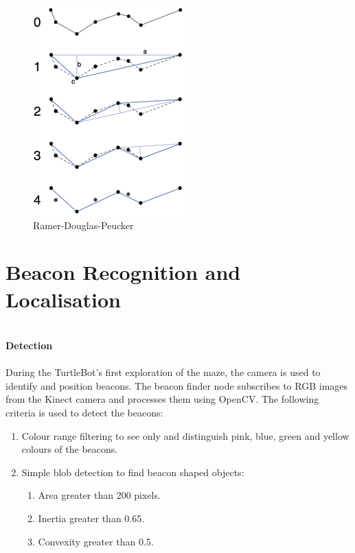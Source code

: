 \documentclass[titlepage,12pt,a4paper]{article}
\begin{document}
\begin{figure}
  	\begin{center}
	\includegraphics[scale=0.7]{rdp.png}
	\caption{Ramer-Douglas-Peucker}
	\end{center}
\end{figure}


\pagebreak


\section*{Beacon Recognition and Localisation}

\large{\textbf{\\Detection}} \\
\normalsize
\\
During the TurtleBot's first exploration of the maze, the camera is used to identify and position beacons. The beacon finder node subscribes to RGB images from the Kinect camera and processes them using OpenCV. The following criteria is used to detect the beacons:

    \begin{enumerate}
        \item Colour range filtering to see only and distinguish pink, blue, green and yellow colours of the beacons.
        \item Simple blob detection to find beacon shaped objects:
        \begin{enumerate}
            \item Area greater than 200 pixels.
            \item Inertia greater than 0.65.
            \item Convexity greater than 0.5.
        \end{enumerate}
    \end{enumerate}
\end{document}
